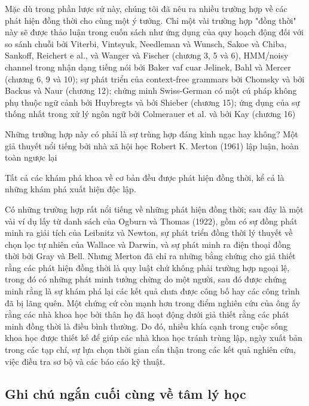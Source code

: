 Mặc dù trong phần lược sử này, chúng tôi đã nêu ra nhiều trường hợp về các phát hiện đồng thời cho cùng một ý tưởng. Chỉ một vài trường hợp "đồng thời" này sẽ được thảo luận trong cuốn sách như ứng dụng của quy hoạch động đối với so sánh chuỗi bởi Viterbi, Vintsyuk, Needleman và Wunsch, Sakoe và Chiba, Sankoff, Reichert e al., và Wanger và Fischer (chương 3, 5 và 6), HMM/noisy channel trong nhận dạng tiếng nói bởi Baker vaf cuar Jelinek, Bahl và Mercer (chương 6, 9 và 10); sự phát triển của context-free grammars bởi Chomsky và bởi Backus và Naur (chương 12); chứng minh Swiss-German có một cú pháp không phụ thuộc ngữ cảnh bởi Huybregts và bởi Shieber (chương 15); ứng dụng của sự thống nhất trong xử lý ngôn ngữ bởi Colmerauer et al. và bởi Kay (chương 16)

Những trường hợp này có phải là sự trùng hợp đáng kinh ngạc hay không? Một giả thuyết nổi tiếng bởi nhà xã hội học Robert K. Merton (1961) lập luận, hoàn toàn ngược lại

\begin{adjustwidth}{1.5cm}{}
Tất cả các khám phá khoa về cơ bản đều được phát hiện đồng thời, kể cả là những khám phá xuất hiện độc lập.
\end{adjustwidth}

Có những trường hợp rất nổi tiếng về những phát hiện đồng thời; sau đây là một vài ví dụ lấy từ danh sách của Ogburn và Thomas (1922), gồm có sự đồng phát minh ra giải tích của Leibnitz và Newton, sự phát triển đồng thời lý thuyết về chọn lọc tự nhiên của Wallace và Darwin, và sự phát minh ra điện thoại đồng thời bởi Gray và Bell. Nhưng Merton đã chỉ ra những bằng chứng cho giả thiết rằng các phát hiện đồng thời là quy luật chứ không phải trường hợp ngoại lệ, trong đó có những phát minh tưởng chừng do một người, sau đó được chứng minh rằng là sự khám phá lại các kết quả chưa được công bố hay các công trình đã bị lãng quên. Một chứng cứ còn mạnh hơn trong điểm nghiên cứu của ông ấy rằng các nhà khoa học bởi thân họ đã hoạt động dưới giả thiết rằng các phát minh đồng thời là điều bình thường. Do đó, nhiều khía cạnh trong cuộc sống khoa học được thiết kế để giúp các nhà khoa học tránh trùng lập, ngày xuất bản trong các tạp chí, sự lựa chọn thời gian cẩn thận trong các kết quả nghiên cứu, việc điều tra sơ bộ và các báo cáo kỹ thuật.

\subsection{Ghi chú ngắn cuối cùng về tâm lý học}

